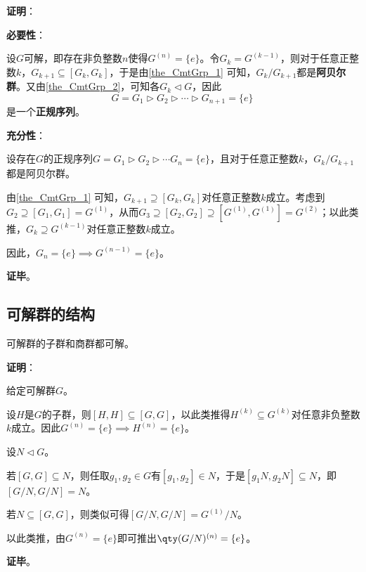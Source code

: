 \textbf{证明}：

\textbf{必要性}：

设$G$可解，即存在非负整数$n$使得$G^{(n)}=\{e\}$。令$G_k=G^{(k-1)}$，则对于任意正整数$k$，$G_{k+1}\subseteq [G_k, G_k]$，于是由\autoref{the_CmtGrp_1} 可知，$G_k/G_{k+1}$都是\textbf{阿贝尔群}。又由\autoref{the_CmtGrp_2}，可知各$G_k\lhd G$，因此
\begin{equation}
G=G_1\rhd G_2\rhd\cdots\rhd G_{n+1}=\{e\}~
\end{equation}
是一个\textbf{正规序列}。

\textbf{充分性}：

设存在$G$的正规序列$G=G_1\rhd G_2\rhd\cdots G_n=\{e\}$，且对于任意正整数$k$，$G_k/G_{k+1}$都是阿贝尔群。

由\autoref{the_CmtGrp_1} 可知，$G_{k+1}\supseteq [G_k, G_k]$对任意正整数$k$成立。考虑到$G_2\supseteq[G_1, G_1]=G^{(1)}$，从而$G_3\supseteq[G_2, G_2]\supseteq [G^{(1)}, G^{(1)}]=G^{(2)}$；以此类推，$G_{k}\supseteq G^{(k-1)}$对任意正整数$k$成立。

因此，$G_n=\{e\}\implies G^{(n-1)}=\{e\}$。

\textbf{证毕}。




\subsection{可解群的结构}



\begin{lemma}{}
可解群的子群和商群都可解。
\end{lemma}



\textbf{证明}：

给定可解群$G$。

设$H$是$G$的子群，则$[H, H]\subseteq [G, G]$，以此类推得$H^{(k)}\subseteq G^{(k)}$对任意非负整数$k$成立。因此$G^{(n)}=\{e\}\implies H^{(n)}=\{e\}$。

设$N\lhd G$。

若$[G, G]\subseteq N$，则任取$g_1, g_2\in G$有$[g_1, g_2]\in N$，于是$[g_1N, g_2N]\subseteq N$，即$[G/N, G/N]=N$。

若$N\subseteq [G, G]$，则类似可得$[G/N, G/N]=G^{(1)}/N$。

以此类推，由$G^{(n)}=\{e\}$即可推出$\qty(G/N)^{(n)}=\{e\}$。


\textbf{证毕}。






